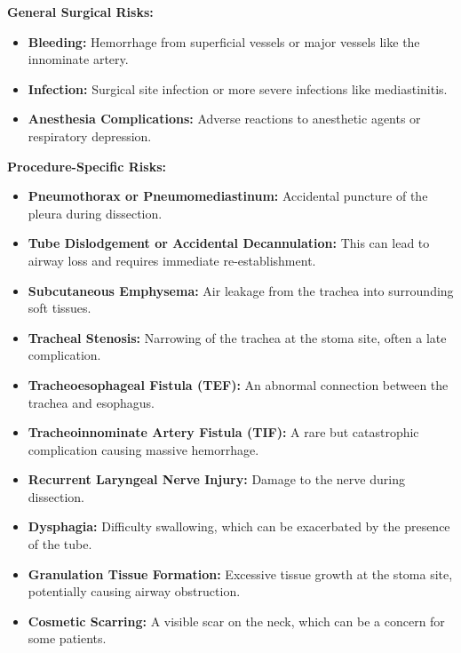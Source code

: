 \textbf{General Surgical Risks:}
\begin{itemize}
  \item \textbf{Bleeding:} Hemorrhage from superficial vessels or major vessels like the innominate artery.

  \item \textbf{Infection:} Surgical site infection or more severe infections like mediastinitis.

  \item \textbf{Anesthesia Complications:} Adverse reactions to anesthetic agents or respiratory depression.
\end{itemize}

\textbf{Procedure-Specific Risks:}
\begin{itemize}
  \item \textbf{Pneumothorax or Pneumomediastinum:} Accidental puncture of the pleura during dissection.

  \item \textbf{Tube Dislodgement or Accidental Decannulation:} This can lead to airway loss and requires immediate re-establishment.

  \item \textbf{Subcutaneous Emphysema:} Air leakage from the trachea into surrounding soft tissues.

  \item \textbf{Tracheal Stenosis:} Narrowing of the trachea at the stoma site, often a late complication.

  \item \textbf{Tracheoesophageal Fistula (TEF):} An abnormal connection between the trachea and esophagus.

  \item \textbf{Tracheoinnominate Artery Fistula (TIF):} A rare but catastrophic complication causing massive hemorrhage.

  \item \textbf{Recurrent Laryngeal Nerve Injury:} Damage to the nerve during dissection.

  \item \textbf{Dysphagia:} Difficulty swallowing, which can be exacerbated by the presence of the tube.

  \item \textbf{Granulation Tissue Formation:} Excessive tissue growth at the stoma site, potentially causing airway obstruction.

  \item \textbf{Cosmetic Scarring:} A visible scar on the neck, which can be a concern for some patients.
\end{itemize}

